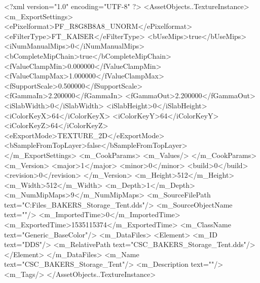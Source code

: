 <?xml version="1.0" encoding="UTF-8" ?>
<AssetObjects..TextureInstance>
	<m_ExportSettings>
		<ePixelformat>PF_R8G8B8A8_UNORM</ePixelformat>
		<eFilterType>FT_KAISER</eFilterType>
		<bUseMips>true</bUseMips>
		<iNumManualMips>0</iNumManualMips>
		<bCompleteMipChain>true</bCompleteMipChain>
		<fValueClampMin>0.000000</fValueClampMin>
		<fValueClampMax>1.000000</fValueClampMax>
		<fSupportScale>0.500000</fSupportScale>
		<fGammaIn>2.200000</fGammaIn>
		<fGammaOut>2.200000</fGammaOut>
		<iSlabWidth>0</iSlabWidth>
		<iSlabHeight>0</iSlabHeight>
		<iColorKeyX>64</iColorKeyX>
		<iColorKeyY>64</iColorKeyY>
		<iColorKeyZ>64</iColorKeyZ>
		<eExportMode>TEXTURE_2D</eExportMode>
		<bSampleFromTopLayer>false</bSampleFromTopLayer>
	</m_ExportSettings>
	<m_CookParams>
		<m_Values/>
	</m_CookParams>
	<m_Version>
		<major>1</major>
		<minor>0</minor>
		<build>0</build>
		<revision>0</revision>
	</m_Version>
	<m_Height>512</m_Height>
	<m_Width>512</m_Width>
	<m_Depth>1</m_Depth>
	<m_NumMipMaps>9</m_NumMipMaps>
	<m_SourceFilePath text="C:\Users\Shadow\Desktop\Working Files\Textures\CSC_BAKERS_Storage_Tent.dds"/>
	<m_SourceObjectName text=""/>
	<m_ImportedTime>0</m_ImportedTime>
	<m_ExportedTime>1535115374</m_ExportedTime>
	<m_ClassName text="Generic_BaseColor"/>
	<m_DataFiles>
		<Element>
			<m_ID text="DDS"/>
			<m_RelativePath text="CSC_BAKERS_Storage_Tent.dds"/>
		</Element>
	</m_DataFiles>
	<m_Name text="CSC_BAKERS_Storage_Tent"/>
	<m_Description text=""/>
	<m_Tags/>
</AssetObjects..TextureInstance>

